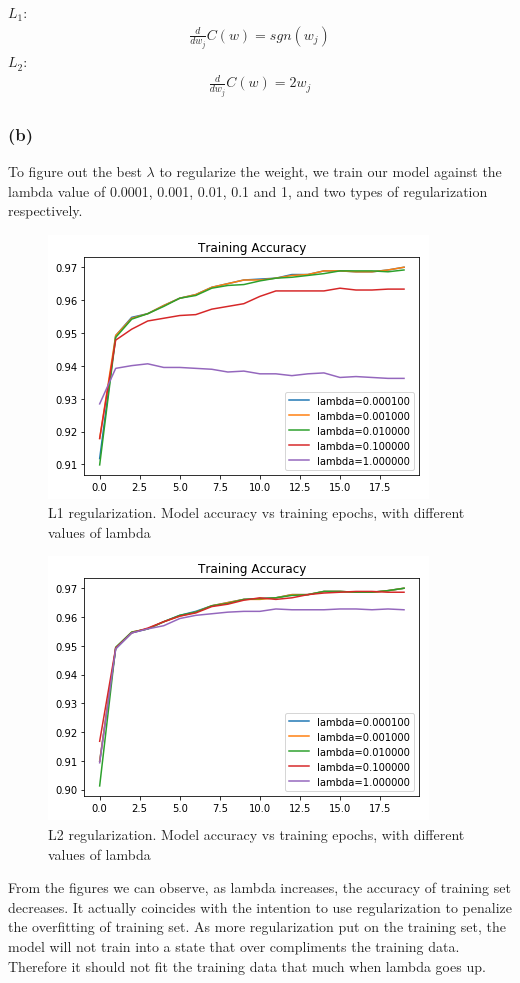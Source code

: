 \documentclass{article}
\begin{document}
$L_1$: \begin{align*}
\frac{d}{dw_j}C(w) = sgn(w_j) 
\end{align*}
$L_2$: \begin{align*}
\frac{d}{dw_j}C(w) = 2w_j 
\end{align*}
\subsubsection*{(b)} 
To figure out the best $\lambda$ to regularize the weight, we train our model against the lambda value of 0.0001, 0.001, 0.01, 0.1 and 1, and two types of regularization respectively.
\begin{figure}[h]
	\centering
	\includegraphics[scale = 0.7]{lambda_train_1.png}
	\caption{L1 regularization. Model accuracy vs training epochs, with different values of lambda}
\end{figure}
\begin{figure}[h]
	\centering
	\includegraphics[scale = 0.7]{lambda_train_2.png}
	\caption{L2 regularization. Model accuracy vs training epochs, with different values of lambda}
\end{figure}

From the figures we can observe, as lambda increases, the accuracy of training set decreases. It actually coincides with the intention to use regularization to penalize the overfitting of training set. As more regularization put on the training set, the model will not train into a state that over compliments the training data. Therefore it should not fit the training data that much when lambda goes up.
\end{document}
